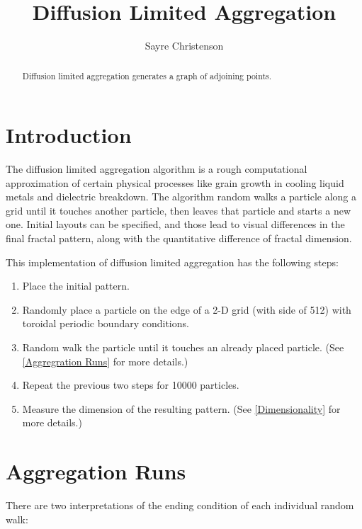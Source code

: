 \documentclass[12pt]{article}
\begin{document}
\title{Diffusion Limited Aggregation}
\date{}
\author{Sayre Christenson}

\maketitle


\begin{abstract}

Diffusion limited aggregation generates a graph of adjoining points.


\end{abstract}

\section*{Introduction}

The diffusion limited aggregation algorithm is a rough computational approximation of certain physical processes like grain growth in cooling liquid metals and dielectric breakdown.
The algorithm random walks a particle along a grid until it touches another particle, then leaves that particle and starts a new one.
Initial layouts can be specified, and those lead to visual differences in the final fractal pattern, along with the quantitative difference of fractal dimension.

This implementation of diffusion limited aggregation has the following steps:

\begin{enumerate}
\item{Place the initial pattern.}
\item{Randomly place a particle on the edge of a 2-D grid (with side of 512) with toroidal periodic boundary conditions.}
\item{Random walk the particle until it touches an already placed particle.  (See \ref{Aggregration Runs} for more details.)}
\item{Repeat the previous two steps for 10000 particles.}
\item{Measure the dimension of the resulting pattern.  (See \ref{Dimensionality} for more details.)}
\end{enumerate}


\section*{Aggregation Runs}

There are two interpretations of the ending condition of each individual random walk:
\end{document}
